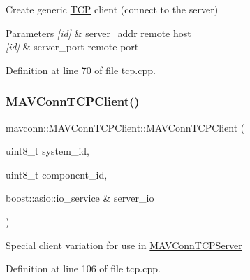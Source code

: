 Create generic \mbox{\hyperlink{classTCP}{T\+CP}} client (connect to the server) 
\begin{DoxyParams}{Parameters}
{\em \mbox{[}id\mbox{]}} & server\+\_\+addr remote host \\
\hline
{\em \mbox{[}id\mbox{]}} & server\+\_\+port remote port \\
\hline
\end{DoxyParams}


Definition at line 70 of file tcp.\+cpp.

\mbox{\label{group__mavconn_ga93a7b76eccf987b4321f7bcc502001b8}} 
\subsubsection{\texorpdfstring{MAVConnTCPClient()}{MAVConnTCPClient()}\hspace{0.1cm}{\footnotesize\ttfamily [2/2]}}
{\footnotesize\ttfamily mavconn\+::\+M\+A\+V\+Conn\+T\+C\+P\+Client\+::\+M\+A\+V\+Conn\+T\+C\+P\+Client (\begin{DoxyParamCaption}\item[{uint8\+\_\+t}]{system\+\_\+id,  }\item[{uint8\+\_\+t}]{component\+\_\+id,  }\item[{boost\+::asio\+::io\+\_\+service \&}]{server\+\_\+io }\end{DoxyParamCaption})\hspace{0.3cm}{\ttfamily [explicit]}}

Special client variation for use in \mbox{\hyperlink{classmavconn_1_1MAVConnTCPServer}{M\+A\+V\+Conn\+T\+C\+P\+Server}} 

Definition at line 106 of file tcp.\+cpp.

\mbox{\label{group__mavconn_gad395465c3a85e4441cbccc84615cacb5}} 
